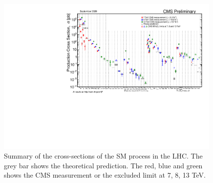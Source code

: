\begin{figure}[ht]
    \centering
    \includegraphics[width=0.99\textwidth]{chapters/RelatedWorks/sectionPPCollision/figures/SigmaNew_v0.pdf}
    \caption{Summary of the cross-sections of the SM process in the LHC. The grey bar shows the theoretical prediction. The red, blue and green shows the CMS measurement or the excluded limit at 7, 8, 13 TeV.}
    \label{fig:relatedWorks:ppCollision:hardxs}
\end{figure}


